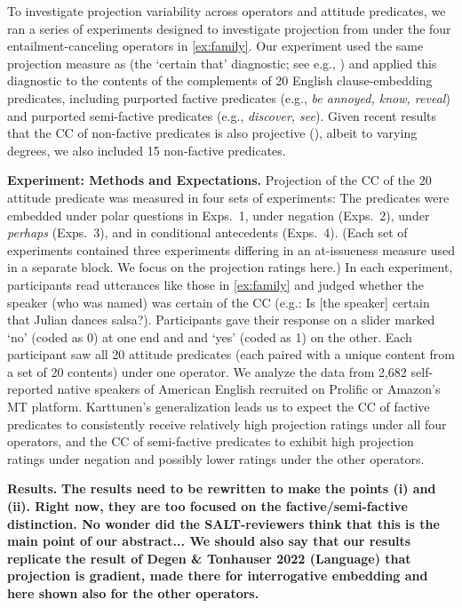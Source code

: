 \documentclass[12pt, letterpaper]{article}
\begin{document}
	To investigate projection variability across operators and attitude predicates, we ran a series of experiments designed to investigate projection from under the four entailment-canceling operators in \ref{ex:family}. Our experiment used the same projection measure as \citealt{sieker_projective_2022} (the `certain that' diagnostic; see e.g., \citealp{tonhauser_how_2018,djarv_prosodic_2017,mahler_social_2020}) and applied this diagnostic to the contents of the complements of 20 English clause-embedding predicates, including purported factive predicates (e.g., \emph{be annoyed, know, reveal}) and purported semi-factive predicates (e.g., \emph{discover, see}). Given recent results that the CC of non-factive predicates is also projective (\citealt{degen_are_2022}), albeit to varying degrees, we also included 15 non-factive predicates.
	


\noindent
{\bf Experiment: Methods and Expectations.}
	Projection of the CC of the 20 attitude predicate was measured in four sets of experiments: The predicates were embedded under polar questions in Exps.~1, under negation (Exps.~2), under {\em perhaps} (Exps.~3), and in conditional antecedents (Exps.~4). (Each set of experiments contained three experiments differing in an at-issueness measure used in a separate block. We focus on the projection ratings here.) In each experiment, participants read utterances like those in \ref{ex:family} and judged whether the speaker (who was named) was certain of the CC (e.g.: Is [the speaker] certain that Julian dances salsa?). Participants gave their response on a slider marked `no' (coded as 0) at one end and and `yes' (coded as 1) on the other. Each participant saw all 20 attitude predicates (each paired with a unique content from a set of 20 contents) under one operator. We analyze the data from 2,682 self-reported native speakers of American English recruited on Prolific or Amazon's MT platform. Karttunen's generalization leads us to expect the CC of factive predicates to consistently receive relatively high projection ratings under all four operators, and the CC of semi-factive predicates to exhibit high projection ratings under negation and possibly lower ratings under the other operators.

\noindent
{\bf Results.}
{\bf The results need to be rewritten to make the points (i) and (ii). Right now, they are too focused on the factive/semi-factive distinction. No wonder did the SALT-reviewers think that this is the main point of our abstract... We should also say that our results replicate the result of Degen \& Tonhauser 2022 (Language) that projection is gradient, made there for interrogative embedding and here shown also for the other operators.}
\end{document}

